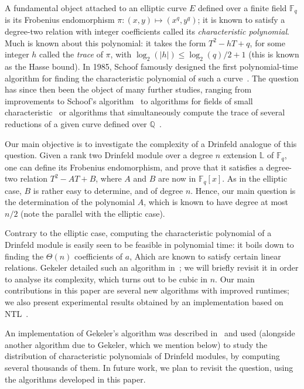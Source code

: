 \documentclass[sigconf]{acmart}
\newcommand{\Q}{\mathbb{Q}}
\newcommand{\F}{\mathbb{F}}
\renewcommand{\L}{\mathbb{L}}
\begin{document}
A fundamental object attached to an elliptic curve $E$ defined over a
finite field $\F_q$ is its Frobenius endomorphism $\pi:(x,y) \mapsto
(x^q,y^q)$; it is known to satisfy a degree-two relation with integer
coefficients called its {\em characteristic polynomial}. Much is known
about this polynomial: it takes the form $T^2 - h T + q$, for some
integer $h$ called the {\em trace} of $\pi$, with $\log_2(|h|) \le
\log_2(q)/2 + 1$ (this is known as the Hasse bound). In 1985, Schoof
famously designed the first polynomial-time algorithm for finding the
characteristic polynomial of such a curve~\cite{schoof85}. The
question has since then been the object of many further studies,
ranging from improvements to Schoof's
algorithm~\cite{Atkin92b,Elkies92} to algorithms for fields of small
characteristic~\cite{Satoh00} or algorithms that simultaneously
compute the trace of several reductions of a given curve defined over
$\Q$~\cite{Harvey14}.

Our main objective is to investigate the complexity of a Drinfeld
analogue of this question. Given a rank two Drinfeld module over a
degree $n$ extension $\L$ of $\F_q$, one can define its Frobenius
endomorphism, and prove that it satisfies a degree-two relation $T^2 -
A T + B$, where $A$ and $B$ are now in $\F_q[x]$. As in the elliptic
case, $B$ is rather easy to determine, and of degree $n$. Hence, our
main question is the determination of the polynomial $A$, which is
known to have degree at most $n/2$ (note the parallel with the
elliptic case).

Contrary to the elliptic case, computing the characteristic polynomial
of a Drinfeld module is easily seen to be feasible in polynomial time:
it boils down to finding the $\Theta(n)$ coefficients of $a$, Ahich
are known to satisfy certain linear relations. Gekeler detailed such
an algorithm in~\cite{GEKELE1991187}; we will briefly revisit it in
order to analyse its complexity, which turns out to be cubic in
$n$. Our main contributions in this paper are several new algorithms
with improved runtimes; we also present experimental results obtained
by an implementation based on NTL~\cite{shoup2001ntl}.

An implementation of Gekeler's algorithm was described
in~\cite{Jung00} and used (alongside another algorithm due to Gekeler,
which we mention below) to study the distribution of characteristic
polynomials of Drinfeld modules, by computing several thousands of
them. In future work, we plan to revisit the question, using the
algorithms developed in this paper.
\end{document}
